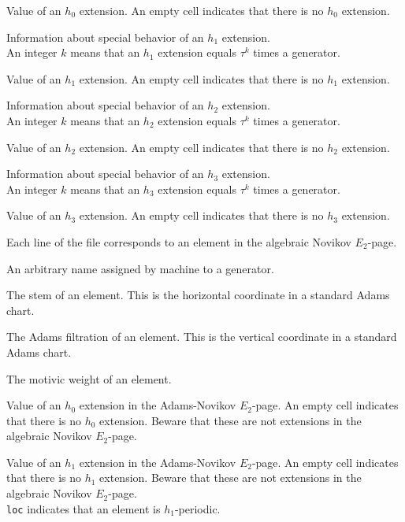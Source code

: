 \documentclass{amsart}
\begin{document}
 Value of an $h_0$ extension.  An empty cell indicates
that there is no $h_0$ extension.

Information about special behavior of an $h_1$ extension. \\
An integer $k$ means that an $h_1$ extension
equals $\tau^k$ times a generator.

 Value of an $h_1$ extension.  An empty cell indicates
that there is no $h_1$ extension.

Information about special behavior of an $h_2$ extension. \\
An integer $k$ means that an $h_2$ extension
equals $\tau^k$ times a generator.

 Value of an $h_2$ extension.  An empty cell indicates
that there is no $h_2$ extension.

Information about special behavior of an $h_3$ extension. \\
An integer $k$ means that an $h_3$ extension
equals $\tau^k$ times a generator.

 Value of an $h_3$ extension.  An empty cell indicates
that there is no $h_3$ extension.

\newpage

Each line of the file corresponds to an element in the
algebraic Novikov $E_2$-page.

An arbitrary name 
assigned by machine to a generator.

 The stem of an element.  This is the horizontal coordinate
in a standard Adams chart.

 The Adams filtration of 
an element.  This is the vertical coordinate in a standard 
Adams chart.

 The motivic weight of an element.

 Value of an $h_0$ extension
in the Adams-Novikov $E_2$-page.  An empty cell indicates
that there is no $h_0$ extension.
Beware that these are not extensions in the algebraic Novikov
$E_2$-page.

 Value of an $h_1$ extension in the 
Adams-Novikov $E_2$-page.  An empty cell indicates
that there is no $h_1$ extension. 
Beware that these are not extensions in the algebraic Novikov
$E_2$-page. \\
\texttt{loc} indicates that an element is $h_1$-periodic.
\end{document}
